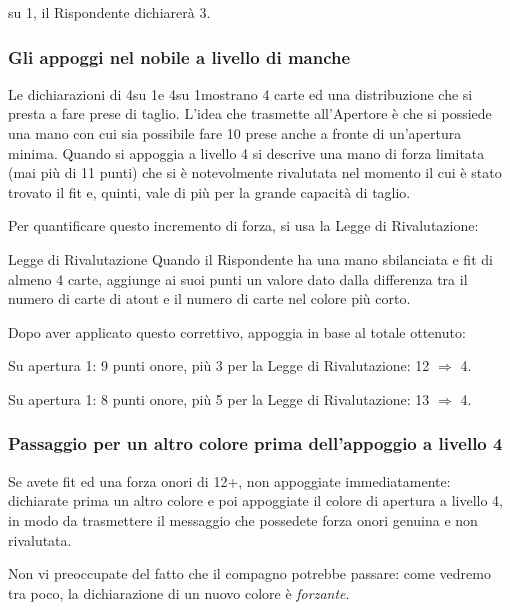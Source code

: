 \documentclass[../corsofiori.tex]{subfiles}
\begin{document}

su 1\Cl, il Rispondente dichiarerà 3\Cl.

\subsubsection{Gli appoggi nel nobile a livello di manche}
Le dichiarazioni di 4\He su 1\He e 4\Sp su 1\Sp mostrano 4 carte ed una distribuzione che si presta a fare prese di
taglio. L'idea che trasmette all'Apertore è che si possiede una mano con cui sia possibile fare 10 prese anche a fronte
di un'apertura minima. Quando si appoggia a livello 4 si descrive una mano di forza limitata (mai più di 11 punti) che
si è notevolmente rivalutata nel momento il cui è stato trovato il fit e, quinti, vale di più per la grande capacità di
taglio.

Per quantificare questo incremento di forza, si usa la Legge di Rivalutazione:

\begin{regola}{Legge di Rivalutazione}
    Quando il Rispondente ha una mano sbilanciata e fit di almeno 4 carte, aggiunge ai suoi punti un valore dato dalla
    differenza tra il numero di carte di atout e il numero di carte nel colore più corto.
\end{regola}

Dopo aver applicato questo correttivo, appoggia in base al totale ottenuto:

\smallskip
{}

        Su apertura 1\He: 9 punti onore, più 3 per la Legge di Rivalutazione: 12 $\Rightarrow$ 4\He.

        \smallskip
{}

Su apertura 1\Sp: 8 punti onore, più 5 per la Legge di Rivalutazione: 13 $\Rightarrow$ 4\Sp.

\subsubsection{Passaggio per un altro colore prima dell'appoggio a livello 4}
    Se avete fit ed una forza onori di 12+, non appoggiate immediatamente: dichiarate prima un altro colore e poi
    appoggiate il colore di apertura a livello 4, in modo da trasmettere il messaggio che possedete forza onori genuina
    e non rivalutata.

    Non vi preoccupate del fatto che il compagno potrebbe passare: come vedremo tra poco, la dichiarazione di un nuovo
    colore è \emph{forzante}.
    \smallskip
\end{document}
